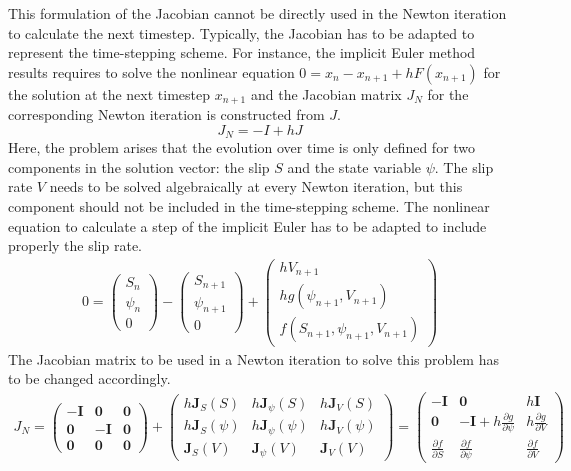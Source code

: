 \documentclass{report}
\begin{document}
This formulation of the Jacobian cannot be directly used in the Newton iteration to calculate the next timestep. Typically, the Jacobian has to be adapted to represent the time-stepping scheme. For instance, the implicit Euler method results requires to solve the nonlinear equation $0 = x_n - x_{n+1} + hF(x_{n+1})$ for the solution at the next timestep $x_{n+1}$ and the Jacobian matrix $J_N$ for the corresponding Newton iteration is constructed from $J$. 
\begin{equation}
	J_N = -I + hJ
\end{equation}
Here, the problem arises that the evolution over time is only defined for two components in the solution vector: the slip $S$ and the state variable $\psi$. The slip rate $V$ needs to be solved algebraically at every Newton iteration, but this component should not be included in the time-stepping scheme. The nonlinear equation to calculate a step of the implicit Euler has to be adapted to include properly the slip rate. 
\begin{align}
	0 = \begin{pmatrix} S_n \\ \psi_n \\ 0 \end{pmatrix} - 
		\begin{pmatrix} S_{n+1} \\ \psi_{n+1} \\ 0 \end{pmatrix} + 
		\begin{pmatrix} hV_{n+1} \\ hg(\psi_{n+1},V_{n+1}) \\ f(S_{n+1}, \psi_{n+1}, V_{n+1}) \end{pmatrix}
\end{align}
The Jacobian matrix to be used in a Newton iteration to solve this problem has to be changed accordingly.
\begin{align}
	J_N = \begin{pmatrix} -\mathbf{I} & \mathbf{0} & \mathbf{0} \\ 
						   \mathbf{0} &-\mathbf{I} & \mathbf{0} \\ 
						   \mathbf{0} & \mathbf{0} & \mathbf{0} \end{pmatrix} + 
          \begin{pmatrix} h\mathbf{J}_S(S)    & h\mathbf{J}_\psi(S)    & h\mathbf{J}_V(S)    \\ 
						  h\mathbf{J}_S(\psi) & h\mathbf{J}_\psi(\psi) & h\mathbf{J}_V(\psi) \\ 
						   \mathbf{J}_S(V)    &  \mathbf{J}_\psi(V)    &  \mathbf{J}_V(V) \end{pmatrix} =
		  \begin{pmatrix} -\mathbf{I}         &  \mathbf{0}            & h\mathbf{I}         \\ 
						   \mathbf{0}         & -\mathbf{I} + h\frac{\partial g}{\partial \psi} & h\frac{\partial g}{\partial V} \\ 
						   \frac{\partial f}{\partial S}    &  \frac{\partial f}{\partial \psi}    &  \frac{\partial f}{\partial V} \end{pmatrix}
\end{align}
\end{document}

